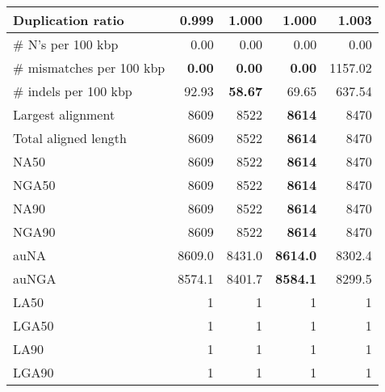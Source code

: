 \documentclass[12pt,a4paper]{article}
\begin{document}
\begin{table}[ht]
\begin{center}
\begin{tabular}{|l*{4}{|r}|}
Duplication ratio & {\bf 0.999} & 1.000 & 1.000 & 1.003 \\ \hline
\# N's per 100 kbp & 0.00 & 0.00 & 0.00 & 0.00 \\ \hline
\# mismatches per 100 kbp & {\bf 0.00} & {\bf 0.00} & {\bf 0.00} & 1157.02 \\ \hline
\# indels per 100 kbp & 92.93 & {\bf 58.67} & 69.65 & 637.54 \\ \hline
Largest alignment & 8609 & 8522 & {\bf 8614} & 8470 \\ \hline
Total aligned length & 8609 & 8522 & {\bf 8614} & 8470 \\ \hline
NA50 & 8609 & 8522 & {\bf 8614} & 8470 \\ \hline
NGA50 & 8609 & 8522 & {\bf 8614} & 8470 \\ \hline
NA90 & 8609 & 8522 & {\bf 8614} & 8470 \\ \hline
NGA90 & 8609 & 8522 & {\bf 8614} & 8470 \\ \hline
auNA & 8609.0 & 8431.0 & {\bf 8614.0} & 8302.4 \\ \hline
auNGA & 8574.1 & 8401.7 & {\bf 8584.1} & 8299.5 \\ \hline
LA50 & 1 & 1 & 1 & 1 \\ \hline
LGA50 & 1 & 1 & 1 & 1 \\ \hline
LA90 & 1 & 1 & 1 & 1 \\ \hline
LGA90 & 1 & 1 & 1 & 1 \\ \hline
\end{tabular}
\end{center}
\end{table}
\end{document}
